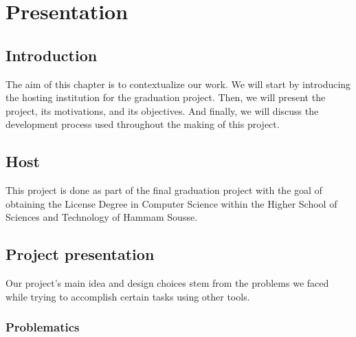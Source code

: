 \chapter{Presentation}
\label{chap:intro}

\section{Introduction}

The aim of this chapter is to contextualize our work.
We will start by introducing the hosting institution for the graduation project.
Then, we will present the project, its motivations, and its objectives.
And finally, we will discuss the development process used throughout the making of this project.


\section{Host}

This project is done as part of the final graduation project with the goal of obtaining the License Degree in Computer Science within the Higher School of Sciences and Technology of Hammam Sousse.

\section{Project presentation}

Our project's main idea and design choices stem from the problems we faced while trying to accomplish certain tasks using other tools.

\subsection{Problematics}

